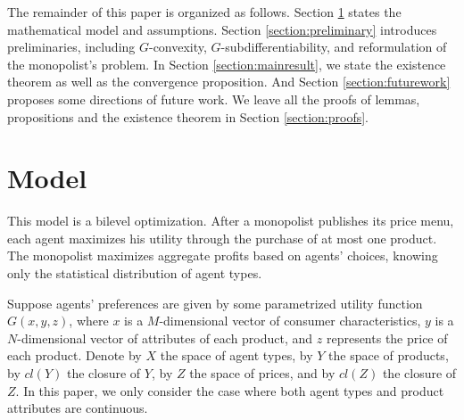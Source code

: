 \documentclass[a4paper, 11pt]{amsart}
\numberwithin{equation}{section}
\theoremstyle{plain}
\theoremstyle{definition}
\theoremstyle{remark}
\begin{document}
 



The remainder of this paper is organized as follows. Section \ref{section:model} states the mathematical model and assumptions. Section \ref{section:preliminary} introduces preliminaries, including $G$-convexity, $G$-subdifferentiability, and reformulation of the monopolist's problem. In Section \ref{section:mainresult}, we state the existence theorem as well as the convergence proposition. And Section \ref{section:futurework} proposes some directions of future work. We leave all the proofs of lemmas, propositions and the existence theorem in Section \ref{section:proofs}. 
 

\bigskip
 

\section{Model}\label{section:model}



{This model is a bilevel optimization. After a monopolist publishes its price menu, each agent maximizes his utility through the purchase of at most one product. The monopolist maximizes aggregate profits based on agents' choices, knowing only the statistical distribution of agent types.}


Suppose agents' preferences are given by some parametrized utility function  $G(x, y, z)$, where $x$ is a $M$-dimensional vector of consumer characteristics, $y$ is a $N$-dimensional vector of attributes of each product, and $z$ represents the price of each product. Denote {by} $X$ the space of agent types, by $Y$ the space of products, by $cl(Y)$ the closure of $Y$, by $Z$ the space of prices, and by $cl(Z)$ the closure of $Z$. {In this paper, we only consider the case where both agent types and product attributes are continuous.} \medskip
\end{document}
